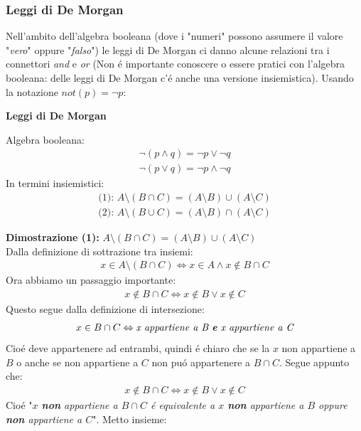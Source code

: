 \documentclass[twoside]{article} %
\begin{document}
	\subsubsection{Leggi di De Morgan}		
	Nell'ambito dell'algebra booleana (dove i "numeri" possono assumere il valore "\textit{vero}" oppure "\textit{falso}") le leggi di De Morgan ci danno alcune relazioni tra i connettori \textit{and} e \textit{or} (Non \'e importante conoscere o essere pratici con l'algebra booleana: delle leggi di De Morgan c'\'e anche una versione insiemistica). Usando la notazione $not(p)=\neg p$:
	\begin{mdframed}[linewidth=1.5pt]
		\centerline{\textbf{Leggi di De Morgan}}
		Algebra booleana:
		\begin{gather*}
			\neg(p\wedge q)=\neg p\vee \neg q\\
			\neg(p\vee q)=\neg p\wedge \neg q
		\end{gather*}
		In termini insiemistici:
		\begin{gather*}
			\text{(1): }A\setminus(B\cap C)=(A\setminus B)\cup (A\setminus C)\\
			\text{(2): }A\setminus(B\cup C)=(A\setminus B)\cap (A\setminus C)
		\end{gather*}	
	\end{mdframed}	
	\textbf{Dimostrazione (1): }$A\setminus(B\cap C)=(A\setminus B)\cup (A\setminus C)$\\Dalla definizione di sottrazione tra insiemi:
	\begin{gather*}
		x\in A\setminus(B\cap C) \Leftrightarrow x\in A \wedge x\notin B\cap C
	\end{gather*}
	Ora abbiamo un passaggio importante:
	\begin{gather*}
		x\notin B\cap C\Leftrightarrow x\notin B \vee x\notin C
	\end{gather*}	
	Questo segue dalla definizione di intersezione:
	\begin{gather*}
		x\in B\cap C\Leftrightarrow \textit{x appartiene a B \textbf{e} x appartiene a C}
	\end{gather*}
	Cio\'e deve appartenere ad entrambi, quindi \'e chiaro che se la $x$ non appartiene a $B$ o anche se non appartiene a $C$ non pu\'o appartenere a $B\cap C$. Segue appunto che:
	\begin{gather*}
		x\notin B\cap C\Leftrightarrow x\notin B \vee x\notin C
	\end{gather*}
	Cio\'e "\textit{$x$ \textbf{non} appartiene a $B\cap C$ \'e equivalente a $x$ \textbf{non} appartiene a $B$ oppure \textbf{non} appartiene a $C$}". Metto insieme:		
\end{document}
